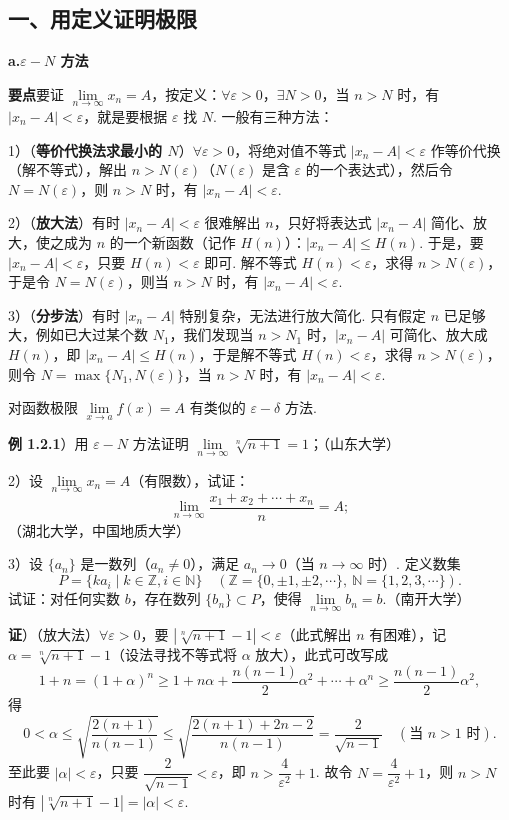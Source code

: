 \documentclass[UTF8, 12pt, fontset=fandol, oneside]{ctexart}
\begin{document}
\subsection*{一、用定义证明极限}

\noindent\textbf{a.\quad $\varepsilon-N$ 方法}

\noindent\textbf{要点}\quad 要证 $\lim\limits_{n\to\infty}x_n=A$，按定义：$\forall\varepsilon>0$，$\exists N>0$，当 $n>N$ 时，有 $|x_n-A|<\varepsilon$，就是要根据 $\varepsilon$ 找 $N$. 一般有三种方法：

1）（\textbf{等价代换法求最小的 $N$}）$\forall\varepsilon>0$，将绝对值不等式 $|x_n-A|<\varepsilon$ 作等价代换（解不等式），解出 $n>N(\varepsilon)$（$N(\varepsilon)$ 是含 $\varepsilon$ 的一个表达式），然后令 $N=N(\varepsilon)$，则 $n>N$ 时，有 $|x_n-A|<\varepsilon$.

2）（\textbf{放大法}）有时 $|x_n-A|<\varepsilon$ 很难解出 $n$，只好将表达式 $|x_n-A|$ 简化、放大，使之成为 $n$ 的一个新函数（记作 $H(n)$）：$|x_n-A|\le H(n)$. 于是，要 $|x_n-A|<\varepsilon$，只要 $H(n)<\varepsilon$ 即可. 解不等式 $H(n)<\varepsilon$，求得 $n>N(\varepsilon)$，于是令 $N=N(\varepsilon)$，则当 $n>N$ 时，有 $|x_n-A|<\varepsilon$.

3）（\textbf{分步法}）有时 $|x_n-A|$ 特别复杂，无法进行放大简化. 只有假定 $n$ 已足够大，例如已大过某个数 $N_1$，我们发现当 $n>N_1$ 时，$|x_n-A|$ 可简化、放大成 $H(n)$，即 $|x_n-A|\le H(n)$，于是解不等式 $H(n)<\varepsilon$，求得 $n>N(\varepsilon)$，则令 $N=\max\{N_1,N(\varepsilon)\}$，当 $n>N$ 时，有 $|x_n-A|<\varepsilon$.

对函数极限 $\lim\limits_{x\to a}f(x)=A$ 有类似的 $\varepsilon-\delta$ 方法.

\noindent\textbf{例 1.2.1}）用 $\varepsilon-N$ 方法证明 $\lim\limits_{n\to\infty}\sqrt[n]{n+1}=1$；（山东大学）

2）设 $\lim\limits_{n\to\infty}x_n=A$（有限数），试证：
\[
  \lim_{n\to\infty}\frac{x_1+x_2+\cdots+x_n}{n}=A;
\]
（湖北大学，中国地质大学）

3）设 $\{a_n\}$ 是一数列（$a_n\ne0$），满足 $a_n\to0$（当 $n\to\infty$ 时）. 定义数集
\[
  P=\{ka_i\mid k\in\mathbb{Z}, i\in\mathbb{N}\}
  \quad(\mathbb{Z}=\{0,\pm1,\pm2,\cdots\},\ \mathbb{N}=\{1,2,3,\cdots\}).
\]
试证：对任何实数 $b$，存在数列 $\{b_n\}\subset P$，使得 $\lim\limits_{n\to\infty}b_n=b$.（南开大学）

\noindent\textbf{证}）（放大法）$\forall\varepsilon>0$，要 $|\sqrt[n]{n+1}-1|<\varepsilon$（此式解出 $n$ 有困难），记 $\alpha=\sqrt[n]{n+1}-1$（设法寻找不等式将 $\alpha$ 放大），此式可改写成
\[
  1+n=(1+\alpha)^n\ge 1+n\alpha+\frac{n(n-1)}2\alpha^2+\cdots+\alpha^n
  \ge \frac{n(n-1)}2\alpha^2,
\]
得
\[
  0<\alpha\le \sqrt{\frac{2(n+1)}{n(n-1)}}
  \le \sqrt{\frac{2(n+1)+2n-2}{n(n-1)}}=\frac2{\sqrt{n-1}}\quad(\text{当 }n>1\text{ 时}).
\]
至此要 $|\alpha|<\varepsilon$，只要 $\dfrac2{\sqrt{n-1}}<\varepsilon$，即 $n>\dfrac4{\varepsilon^2}+1$. 故令 $N=\dfrac4{\varepsilon^2}+1$，则 $n>N$ 时有 $|\sqrt[n]{n+1}-1|=|\alpha|<\varepsilon$.
\end{document}
